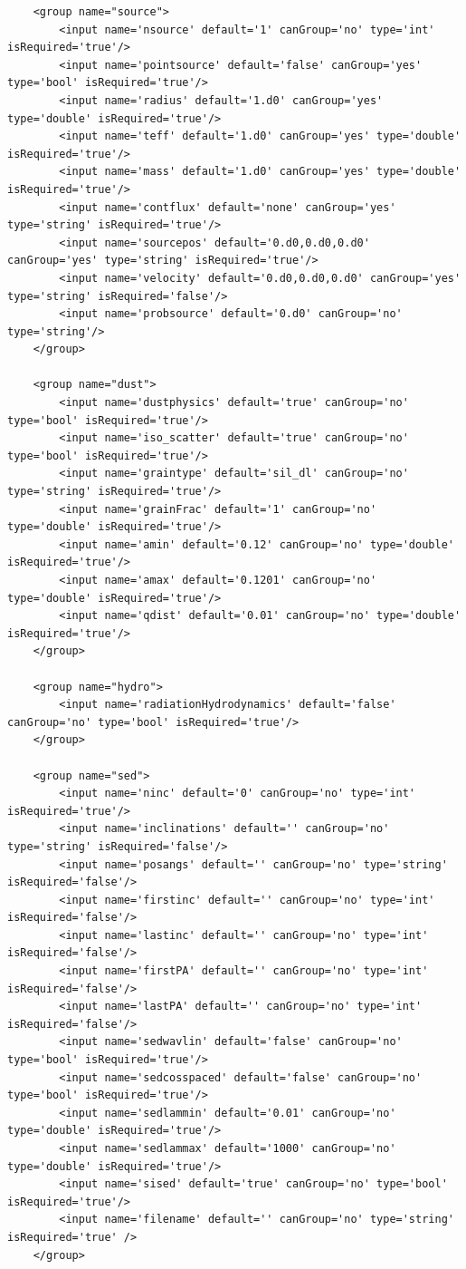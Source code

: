 \documentclass[a4paper,10pt]{article}
\begin{document}
\begin{lstlisting}
    <group name="source">
        <input name='nsource' default='1' canGroup='no' type='int' isRequired='true'/>
        <input name='pointsource' default='false' canGroup='yes' type='bool' isRequired='true'/>
        <input name='radius' default='1.d0' canGroup='yes' type='double' isRequired='true'/>
        <input name='teff' default='1.d0' canGroup='yes' type='double' isRequired='true'/>
        <input name='mass' default='1.d0' canGroup='yes' type='double' isRequired='true'/>
        <input name='contflux' default='none' canGroup='yes' type='string' isRequired='true'/>
        <input name='sourcepos' default='0.d0,0.d0,0.d0' canGroup='yes' type='string' isRequired='true'/>
        <input name='velocity' default='0.d0,0.d0,0.d0' canGroup='yes' type='string' isRequired='false'/>
        <input name='probsource' default='0.d0' canGroup='no' type='string'/>
    </group>

    <group name="dust">
        <input name='dustphysics' default='true' canGroup='no' type='bool' isRequired='true'/>
        <input name='iso_scatter' default='true' canGroup='no' type='bool' isRequired='true'/>
        <input name='graintype' default='sil_dl' canGroup='no' type='string' isRequired='true'/>
        <input name='grainFrac' default='1' canGroup='no' type='double' isRequired='true'/>
        <input name='amin' default='0.12' canGroup='no' type='double' isRequired='true'/>
        <input name='amax' default='0.1201' canGroup='no' type='double' isRequired='true'/>
        <input name='qdist' default='0.01' canGroup='no' type='double' isRequired='true'/>
    </group>

    <group name="hydro">
        <input name='radiationHydrodynamics' default='false' canGroup='no' type='bool' isRequired='true'/>
    </group>

    <group name="sed">
        <input name='ninc' default='0' canGroup='no' type='int' isRequired='true'/>
        <input name='inclinations' default='' canGroup='no' type='string' isRequired='false'/>
        <input name='posangs' default='' canGroup='no' type='string' isRequired='false'/>
        <input name='firstinc' default='' canGroup='no' type='int' isRequired='false'/>
        <input name='lastinc' default='' canGroup='no' type='int' isRequired='false'/>
        <input name='firstPA' default='' canGroup='no' type='int' isRequired='false'/>
        <input name='lastPA' default='' canGroup='no' type='int' isRequired='false'/>
        <input name='sedwavlin' default='false' canGroup='no' type='bool' isRequired='true'/>
        <input name='sedcosspaced' default='false' canGroup='no' type='bool' isRequired='true'/>
        <input name='sedlammin' default='0.01' canGroup='no' type='double' isRequired='true'/>
        <input name='sedlammax' default='1000' canGroup='no' type='double' isRequired='true'/>
        <input name='sised' default='true' canGroup='no' type='bool' isRequired='true'/>
        <input name='filename' default='' canGroup='no' type='string' isRequired='true' />
    </group>


\end{lstlisting}
\end{document}

